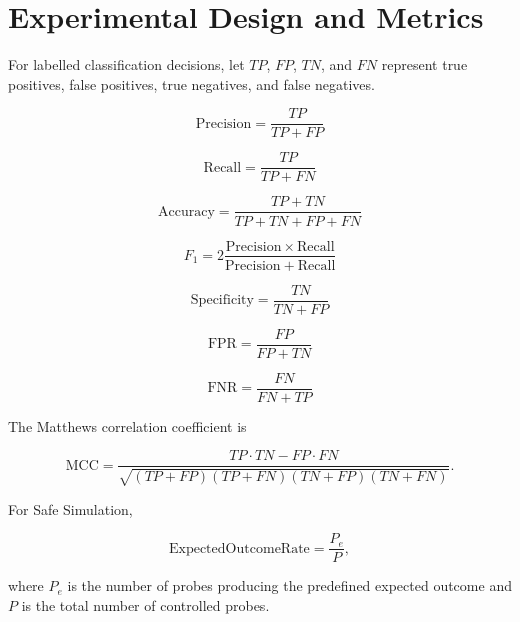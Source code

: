 \documentclass[journal]{IEEEtran}
\begin{document}
\section{Experimental Design and Metrics}

For labelled classification decisions, let $TP$, $FP$, $TN$, and $FN$
represent true positives, false positives, true negatives, and false
negatives.

\begin{equation}
\mathrm{Precision}
=
\frac{TP}{TP+FP}
\label{eq:precision}
\end{equation}

\begin{equation}
\mathrm{Recall}
=
\frac{TP}{TP+FN}
\label{eq:recall}
\end{equation}

\begin{equation}
\mathrm{Accuracy}
=
\frac{TP+TN}{TP+TN+FP+FN}
\label{eq:accuracy}
\end{equation}

\begin{equation}
F_1
=
2
\frac{\mathrm{Precision}\times\mathrm{Recall}}
{\mathrm{Precision}+\mathrm{Recall}}
\label{eq:f1}
\end{equation}

\begin{equation}
\mathrm{Specificity}
=
\frac{TN}{TN+FP}
\label{eq:specificity}
\end{equation}

\begin{equation}
\mathrm{FPR}
=
\frac{FP}{FP+TN}
\label{eq:fpr}
\end{equation}

\begin{equation}
\mathrm{FNR}
=
\frac{FN}{FN+TP}
\label{eq:fnr}
\end{equation}

The Matthews correlation coefficient is

\begin{equation}
\mathrm{MCC}
=
\frac{TP\cdot TN-FP\cdot FN}
{\sqrt{(TP+FP)(TP+FN)(TN+FP)(TN+FN)}}.
\label{eq:mcc}
\end{equation}

For Safe Simulation,

\begin{equation}
\mathrm{ExpectedOutcomeRate}
=
\frac{P_e}{P},
\label{eq:expected-rate}
\end{equation}

where $P_e$ is the number of probes producing the predefined expected
outcome and $P$ is the total number of controlled probes.
\end{document}

